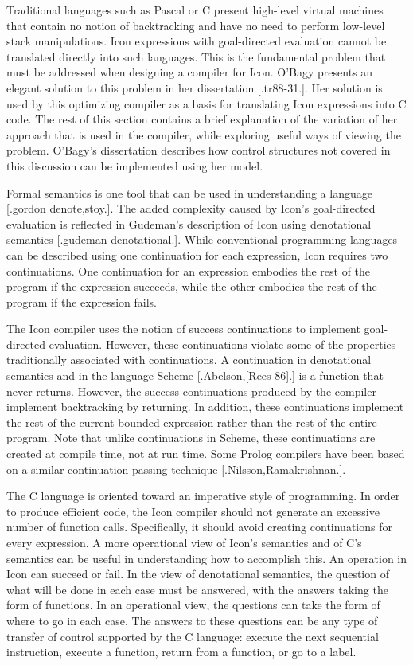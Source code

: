 Traditional languages such as Pascal or C present high-level virtual
machines that contain no notion of backtracking and have no need to
perform low-level stack manipulations. Icon expressions with
goal-directed evaluation cannot be translated directly into such
languages. This is the fundamental problem that must be addressed when
designing a compiler for Icon. O'Bagy presents an elegant solution to
this problem in her dissertation [.tr88-31.]. Her solution is used by
this optimizing compiler as a basis for translating Icon expressions
into C code. The rest of this section contains a brief explanation of
the variation of her approach that is used in the compiler, while
exploring useful ways of viewing the problem. O'Bagy's dissertation
describes how control structures not covered in this discussion can be
implemented using her model.

Formal semantics is one tool that can be used in understanding a
language [.gordon denote,stoy.]. The added complexity caused by Icon's
goal-directed evaluation is reflected in Gudeman's description of Icon
using denotational semantics [.gudeman denotational.]. While
conventional programming languages can be described using one
continuation for each expression, Icon requires two continuations. One
continuation for an expression embodies the rest of the program if the
expression succeeds, while the other embodies the rest of the program
if the expression fails.

The Icon compiler uses the notion of success continuations to
implement goal-directed evaluation. However, these continuations
violate some of the properties traditionally associated with
continuations. A continuation in denotational semantics and in the
language Scheme [.Abelson,[Rees 86].] is a function that never
returns. However, the success continuations produced by the compiler
implement backtracking by returning. In addition, these continuations
implement the rest of the current bounded expression rather than the
rest of the entire program. Note that unlike continuations in Scheme,
these continuations are created at compile time, not at run time. Some
Prolog compilers have been based on a similar continuation-passing
technique [.Nilsson,Ramakrishnan.].

The C language is oriented toward an imperative style of
programming. In order to produce efficient code, the Icon compiler
should not generate an excessive number of function
calls. Specifically, it should avoid creating continuations for every
expression. A more operational view of Icon's semantics and of C's
semantics can be useful in understanding how to accomplish this. An
operation in Icon can succeed or fail. In the view of denotational
semantics, the question of what will be done in each case must be
answered, with the answers taking the form of functions. In an
operational view, the questions can take the form of where to go in
each case. The answers to these questions can be any type of transfer
of control supported by the C language: execute the next sequential
instruction, execute a function, return from a function, or go to a
label.

